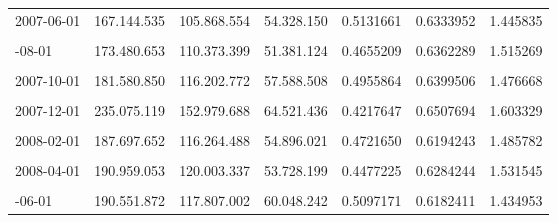 \documentclass[12pt]{article}
\begin{document}
\begin{longtable}[t]{llllrrr}
2007-06-01 & 167.144.535 & 105.868.554 & 54.328.150 & 0.5131661 & 0.6333952 & 1.445835\\
\cellcolor{gray!10}{2007-07-01} & \cellcolor{gray!10}{169.869.344} & \cellcolor{gray!10}{108.686.777} & \cellcolor{gray!10}{54.629.514} & \cellcolor{gray!10}{0.5026326} & \cellcolor{gray!10}{0.6398257} & \cellcolor{gray!10}{1.466767}\\
\addlinespace
2007-08-01 & 173.480.653 & 110.373.399 & 51.381.124 & 0.4655209 & 0.6362289 & 1.515269\\
\cellcolor{gray!10}{2007-09-01} & \cellcolor{gray!10}{178.379.774} & \cellcolor{gray!10}{112.221.174} & \cellcolor{gray!10}{54.181.459} & \cellcolor{gray!10}{0.4828096} & \cellcolor{gray!10}{0.6291138} & \cellcolor{gray!10}{1.482298}\\
2007-10-01 & 181.580.850 & 116.202.772 & 57.588.508 & 0.4955864 & 0.6399506 & 1.476668\\
\cellcolor{gray!10}{2007-11-01} & \cellcolor{gray!10}{191.309.446} & \cellcolor{gray!10}{121.973.280} & \cellcolor{gray!10}{61.511.310} & \cellcolor{gray!10}{0.5043015} & \cellcolor{gray!10}{0.6375706} & \cellcolor{gray!10}{1.462080}\\
2007-12-01 & 235.075.119 & 152.979.688 & 64.521.436 & 0.4217647 & 0.6507694 & 1.603329\\
\addlinespace
\cellcolor{gray!10}{2008-01-01} & \cellcolor{gray!10}{193.738.675} & \cellcolor{gray!10}{120.700.544} & \cellcolor{gray!10}{57.549.988} & \cellcolor{gray!10}{0.4767997} & \cellcolor{gray!10}{0.6230070} & \cellcolor{gray!10}{1.483586}\\
2008-02-01 & 187.697.652 & 116.264.488 & 54.896.021 & 0.4721650 & 0.6194243 & 1.485782\\
\cellcolor{gray!10}{2008-03-01} & \cellcolor{gray!10}{187.702.397} & \cellcolor{gray!10}{117.618.217} & \cellcolor{gray!10}{58.792.633} & \cellcolor{gray!10}{0.4998599} & \cellcolor{gray!10}{0.6266208} & \cellcolor{gray!10}{1.456448}\\
2008-04-01 & 190.959.053 & 120.003.337 & 53.728.199 & 0.4477225 & 0.6284244 & 1.531545\\
\cellcolor{gray!10}{2008-05-01} & \cellcolor{gray!10}{187.522.192} & \cellcolor{gray!10}{115.492.925} & \cellcolor{gray!10}{61.129.475} & \cellcolor{gray!10}{0.5292919} & \cellcolor{gray!10}{0.6158894} & \cellcolor{gray!10}{1.408260}\\
\addlinespace
2008-06-01 & 190.551.872 & 117.807.002 & 60.048.242 & 0.5097171 & 0.6182411 & 1.434953\\

\end{longtable}
\end{document}

